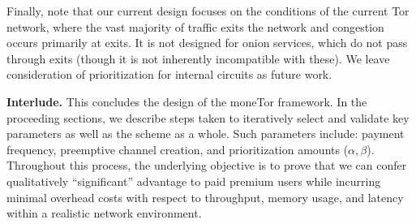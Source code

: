 Finally, note that our current design focuses on the conditions of the current Tor network, where the vast majority of traffic exits the network and congestion occurs primarily at exits.
It is not designed for onion services, which do not pass through exits (though it is not inherently incompatible with these).
We leave consideration of prioritization for internal circuits as future work.

\medskip \noindent \textbf{Interlude.}
This concludes the design of the moneTor framework.
In the proceeding sections, we describe steps taken to iteratively select and validate key parameters as well as the scheme as a whole.
Such parameters include: payment frequency, preemptive channel creation, and prioritization amounts ($\alpha, \beta$).
Throughout this process, the underlying objective is to prove that we can confer qualitatively ``significant'' advantage to paid premium users while incurring minimal overhead costs with respect to throughput, memory usage, and latency within a realistic network environment.


